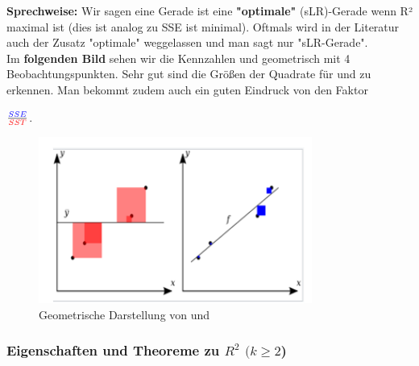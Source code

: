 \documentclass[12pt]{article}
\begin{document}
% 
\textbf{Sprechweise:} Wir sagen eine Gerade ist eine \textbf{"optimale"} (sLR)-Gerade wenn R² maximal ist (dies ist analog zu SSE ist minimal). Oftmals wird in der Literatur auch der Zusatz "optimale" weggelassen und man sagt nur "sLR-Gerade".\\[0.4 cm]
% 
% 
Im \textbf{folgenden Bild} sehen wir die Kennzahlen {\color{blue}{SSE}} und {\color{red}{SST}} geometrisch mit 4 Beobachtungspunkten. Sehr gut sind die Größen der Quadrate für {\color{blue}{SSE}} und {\color{red}{SST}} zu erkennen. Man bekommt zudem auch ein guten Eindruck von den Faktor 
\begin{large}
$ \frac{\color{blue}{SSE}}{\color{red}{SST}} $.\\[8.8cm]
\end{large}
%
\begin{figure}[htp]
\hspace*{-0.2cm}  
\centering 
\includegraphics[width=0.8\textwidth]{SSE_SST-Definition}
  \caption{Geometrische Darstellung von {\color{blue}{SSE}} und {\color{red}{SST}}}
  \label{fig:SSE-SST-1}
\end{figure}
%
\subsubsection{Eigenschaften und Theoreme zu $R^2$ $(k \geqslant 2$) } 
\end{document}
